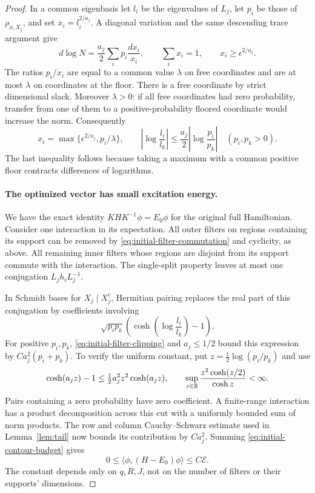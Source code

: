 \begin{proof}
In a common eigenbasis let $l_i$ be the eigenvalues of $L_j$, let $p_i$
be those of $\rho_{\phi,X_j}$, and set $x_i=l_i^{2/a_j}$.
A diagonal variation and the same descending trace argument give
\[
 d\log N=\frac{a_j}{2}\sum_i p_i\frac{dx_i}{x_i},
 \qquad \sum_i x_i=1,\qquad x_i\ge\epsilon^{2/a_j}.
\]
The ratios $p_i/x_i$ are equal to a common value $\lambda$ on free
coordinates and are at most $\lambda$ on coordinates at the floor.
There is a free coordinate by strict dimensional slack.  Moreover
$\lambda>0$: if all free coordinates had zero probability, transfer
from one of them to a positive-probability floored coordinate would
increase the norm.  Consequently
\begin{equation}
 x_i=\max\{\epsilon^{2/a_j},p_i/\lambda\},\qquad
 \left|\log\frac{l_i}{l_k}\right|
 \le\frac{a_j}{2}\left|\log\frac{p_i}{p_k}\right|
 \quad(p_i,p_k>0).
 \label{eq:initial-filter-clipping}
\end{equation}
The last inequality follows because taking a maximum with a common
positive floor contracts differences of logarithms.

\paragraph{The optimized vector has small excitation energy.}
We have the exact identity $KHK^{-1}\phi=E_0\phi$ for the original
full Hamiltonian.  Consider one interaction in its expectation.
All outer filters on regions containing its support can be removed
by \eqref{eq:initial-filter-commutation} and cyclicity, as above.
All remaining inner filters whose regions are disjoint from its
support commute with the interaction.  The single-split property
leaves at most one conjugation $L_jh_iL_j^{-1}$.

In Schmidt bases for $X_j\mid X_j^c$, Hermitian pairing replaces the
real part of this conjugation by coefficients involving
\[
 \sqrt{p_i p_k}
 \left(\cosh\left(\log\frac{l_i}{l_k}\right)-1\right).
\]
For positive $p_i,p_k$, \eqref{eq:initial-filter-clipping} and
$a_j\le1/2$ bound this expression by $C a_j^2(p_i+p_k)$.
To verify the uniform constant, put
$z=\tfrac12\log(p_i/p_k)$ and use
\[
 \cosh(a_jz)-1\le\tfrac12a_j^2z^2\cosh(a_jz),
 \qquad
 \sup_{z\in\mathbb R}\frac{z^2\cosh(z/2)}{\cosh z}<\infty.
\]
Pairs containing a zero probability have zero coefficient.
A finite-range interaction has a product decomposition across this
cut with a uniformly bounded sum of norm products.  The row and
column Cauchy--Schwarz estimate used in Lemma~\ref{lem:tail} now bounds
its contribution by $C a_j^2$.  Summing
\eqref{eq:initial-contour-budget} gives
\begin{equation}
 0\le\langle\phi,(H-E_0)\phi\rangle\le C\mathcal E.
 \label{eq:initial-product-energy}
\end{equation}
The constant depends only on $q,R,J$, not on the number of filters or
their supports' dimensions.


\end{proof}
